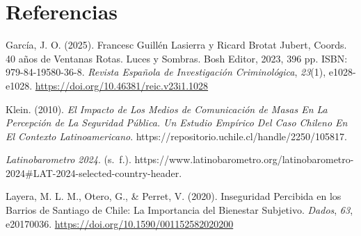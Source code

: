 \documentclass[
  spanish,
  a4paper,
  oneside]{scrbook}
\newlength{\cslhangindent}
\newenvironment{CSLReferences}[2] %
 {\begin{list}{}{%
  \setlength{\itemindent}{0pt}
  \setlength{\leftmargin}{0pt}
  \setlength{\parsep}{0pt}
  \ifodd #1
   \setlength{\leftmargin}{\cslhangindent}
   \setlength{\itemindent}{-1\cslhangindent}
  \fi
  \setlength{\itemsep}{#2\baselineskip}}}
 {\end{list}}
\begin{document}

\chapter{Referencias}\label{referencias}

\protect{}\label{refs}
\begin{CSLReferences}{1}{0}
García, J. O. (2025). {Francesc Guillén Lasierra y Ricard Brotat Jubert,
Coords. 40 años de Ventanas Rotas. Luces y Sombras. Bosh Editor, 2023,
396 pp. ISBN: 979-84-19580-36-8}. \emph{Revista Española de
Investigación Criminológica}, \emph{23}(1), e1028-e1028.
\url{https://doi.org/10.46381/reic.v23i1.1028}

Klein. (2010). \emph{El Impacto de Los Medios de Comunicación de Masas
En La Percepción de La Seguridad Pública. Un Estudio Empírico Del Caso
Chileno En El Contexto Latinoamericano}.
https://repositorio.uchile.cl/handle/2250/105817.

\emph{Latinobarometro 2024}. (s.~f.).
https://www.latinobarometro.org/latinobarometro-2024\#LAT-2024-selected-country-header.

Layera, M. L. M., Otero, G., \& Perret, V. (2020). {Inseguridad
Percibida en los Barrios de Santiago de Chile: La Importancia del
Bienestar Subjetivo}. \emph{Dados}, \emph{63}, e20170036.
\url{https://doi.org/10.1590/001152582020200}

\end{CSLReferences}


\backmatter

\mainmatter
\pagestyle{scrheadings}

\end{document}
